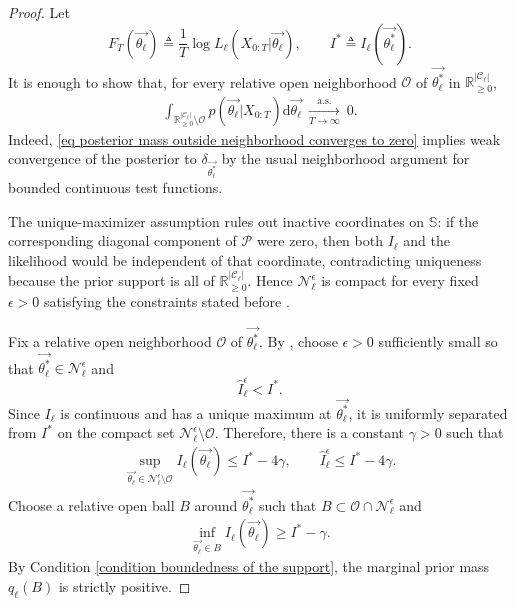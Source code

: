 \documentclass[pdflatex,sn-mathphys-num]{sn-jnl}%
\def\dd{\text{d}}
\theoremstyle{thmstyleone}%
\theoremstyle{thmstyletwo}%
\theoremstyle{thmstylethree}%
\begin{document}
\begin{appendices}
\begin{proof}
    Let
    \[
        F_T\left(\overrightarrow{\theta_\ell}\right)
        \triangleq
        \frac{1}{T}\log L_\ell\left(X_{0:T}\big|\overrightarrow{\theta_\ell}\right),
        \qquad
        I^*
        \triangleq
        I_\ell\left(\overrightarrow{\theta^*_\ell}\right).
    \]
    It is enough to show that, for every relative open neighborhood $\mathcal O$ of $\overrightarrow{\theta^*_\ell}$ in $\mathbb R_{\geq0}^{|\mathcal C_\ell|}$,
    \begin{align}\label{eq posterior mass outside neighborhood converges to zero}
        \int_{\mathbb R_{\geq0}^{|\mathcal C_\ell|}\setminus\mathcal O}
        p\left(\overrightarrow{\theta_\ell}\big|X_{0:T}\right)
        \dd\overrightarrow{\theta_\ell}
        ~\xrightarrow[T\to\infty]{\text{a.s.}}~0 .
    \end{align}
    Indeed, \eqref{eq posterior mass outside neighborhood converges to zero} implies weak convergence of the posterior to $\delta_{\overrightarrow{\theta^*_\ell}}$ by the usual neighborhood argument for bounded continuous test functions.

    The unique-maximizer assumption rules out inactive coordinates on $\mathbb S$: if the corresponding diagonal component of $\mathcal P$ were zero, then both $I_\ell$ and the likelihood would be independent of that coordinate, contradicting uniqueness because the prior support is all of $\mathbb R_{\geq0}^{|\mathcal C_\ell|}$.
    Hence $\mathcal N_\ell^\epsilon$ is compact for every fixed $\epsilon>0$ satisfying the constraints stated before .

    Fix a relative open neighborhood $\mathcal O$ of $\overrightarrow{\theta^*_\ell}$.
    By , choose $\epsilon>0$ sufficiently small so that $\overrightarrow{\theta^*_\ell}\in\mathcal N_\ell^\epsilon$ and
    \[
        \hat I_\ell^\epsilon < I^* .
    \]
    Since $I_\ell$ is continuous and has a unique maximum at $\overrightarrow{\theta^*_\ell}$, it is uniformly separated from $I^*$ on the compact set $\mathcal N_\ell^\epsilon\setminus\mathcal O$.
    Therefore, there is a constant $\gamma>0$ such that
    \begin{align}\label{eq deterministic likelihood gap}
        \sup_{\overrightarrow{\theta_\ell}\in\mathcal N_\ell^\epsilon\setminus\mathcal O}
        I_\ell\left(\overrightarrow{\theta_\ell}\right)
        \leq I^*-4\gamma,
        \qquad
        \hat I_\ell^\epsilon \leq I^*-4\gamma .
    \end{align}
    Choose a relative open ball $B$ around $\overrightarrow{\theta^*_\ell}$ such that $B\subset\mathcal O\cap\mathcal N_\ell^\epsilon$ and
    \begin{align}\label{eq local lower gap for I}
        \inf_{\overrightarrow{\theta_\ell}\in B}
        I_\ell\left(\overrightarrow{\theta_\ell}\right)
        \geq I^*-\gamma .
    \end{align}
    By Condition \ref{condition boundedness of the support}, the marginal prior mass $q_\ell(B)$ is strictly positive.


\end{proof}
\end{appendices}
\end{document}
